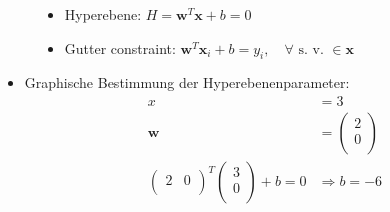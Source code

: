 \begin{frame}
\begin{figure}[h]
\begin{minipage}{0.4\textwidth}
{\begin{figure}[h]
{                    }
                \end{figure}
            }
        \end{minipage}
        \hfill
        \begin{minipage}{0.4\textwidth}
            \begin{itemize}
                \item<1-> Hyperebene: $ H = \boldsymbol{w}^T \boldsymbol{x} + b = 0 $
                \item<1-> Gutter constraint: $ \boldsymbol{w}^T \boldsymbol{x}_i + b = y_i, \quad \forall \text{ s. v. } \in \boldsymbol{x} $
            \end{itemize} 
        \end{minipage}
    \end{figure}

    \begin{itemize}
        \item <2-> Graphische Bestimmung der Hyperebenenparameter:
            \begin{align*}
                x &= 3 \\
                \boldsymbol{w} &= \left( \begin{matrix}
                    2 \\
                    0 \\
                \end{matrix} \right) \\
                \left( \begin{matrix}
                    2 & 0 \\
                \end{matrix} \right)^T \left( \begin{matrix}
                    3 \\
                    0 \\
                \end{matrix} \right) + b = 0 &\Rightarrow b = -6 \\
            \end{align*}
    \end{itemize}
\end{frame}

